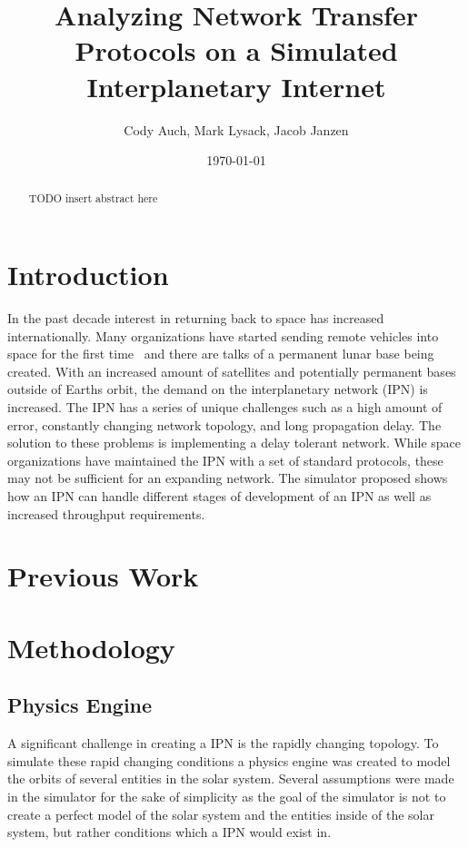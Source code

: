 \documentclass[a4paper,12pt]{article}
\title{Analyzing Network Transfer Protocols on a Simulated Interplanetary Internet}
\author{Cody Auch, Mark Lysack, Jacob Janzen}
\date{\today}
\begin{document}
\maketitle

\begin{abstract}
    TODO insert abstract here
\end{abstract}

\section{Introduction}

In the past decade interest in returning back to space has increased
internationally. Many organizations have started sending remote vehicles into
space for the first time~%
and there
are talks of a permanent lunar base being created. With an increased amount of
satellites and potentially permanent bases outside of Earths orbit, the demand
on the interplanetary network (IPN) is increased. The IPN has a series of unique
challenges such as a high amount of error, constantly changing network topology,
and long propagation delay. The solution to these problems is implementing a
delay tolerant network. While space organizations have maintained the IPN with a
set of standard protocols, these may not be sufficient for an expanding network.
The simulator proposed shows how an IPN can handle different stages of
development of an IPN as well as increased throughput requirements.

\section{Previous Work}

\section{Methodology}

\subsection{Physics Engine}

A significant challenge in creating a IPN is the rapidly changing topology. To
simulate these rapid changing conditions a physics engine was created to model
the orbits of several entities in the solar system. Several assumptions were
made in the simulator for the sake of simplicity as the goal of the simulator is
not to create a perfect model of the solar system and the entities inside of the
solar system, but rather conditions which a IPN would exist in.
\end{document}

